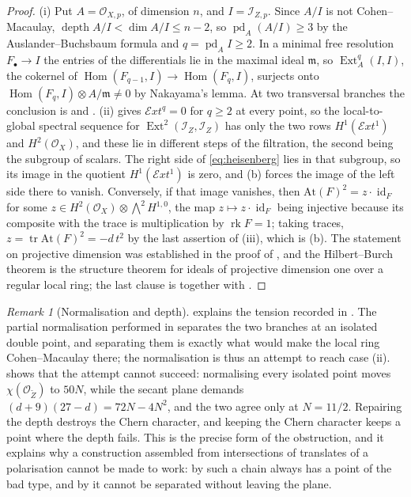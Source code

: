 \documentclass[11pt,reqno]{amsart}
\theoremstyle{plain}
\theoremstyle{definition}
\theoremstyle{remark}
\newtheorem{remark}[theorem]{Remark}
\newcommand{\cE}{\mathcal{E}}
\newcommand{\cO}{\mathcal{O}}
\newcommand{\cI}{\mathcal{I}}
\DeclareMathOperator{\rk}{rk}
\DeclareMathOperator{\Hom}{Hom}
\DeclareMathOperator{\Ext}{Ext}
\DeclareMathOperator{\id}{id}
\begin{document}
\begin{proof}
(i) Put $A=\cO_{X,p}$, of dimension $n$, and $I=\cI_{Z,p}$. Since $A/I$ is not
Cohen--Macaulay, $\operatorname{depth}A/I<\dim A/I\le n-2$, so
$\operatorname{pd}_{A}(A/I)\ge3$ by the Auslander--Buchsbaum formula and
$q=\operatorname{pd}_{A}I\ge2$. In a minimal free resolution
$F_{\bullet}\to I$ the entries of the differentials lie in the maximal ideal
$\mathfrak m$, so $\Ext^{q}_{A}(I,I)$, the cokernel of
$\Hom(F_{q-1},I)\to\Hom(F_{q},I)$, surjects onto
$\Hom(F_{q},I)\otimes A/\mathfrak m\ne0$ by Nakayama's lemma. At two
transversal branches the conclusion is  and
. (ii)  gives
$\cE xt^{q}=0$ for $q\ge2$ at every point, so the local-to-global spectral
sequence for $\Ext^{2}(\cI_{Z},\cI_{Z})$ has only the two rows
$H^{1}(\cE xt^{1})$ and $H^{2}(\cO_{X})$, and these lie in different steps of
the filtration, the second being the subgroup of scalars. The right side of
\eqref{eq:heisenberg} lies in that subgroup, so its image in the quotient
$H^{1}(\cE xt^{1})$ is zero, and (b) forces the image of the left side there
to vanish. Conversely, if that image vanishes, then
$\mathrm{At}(F)^{2}=z\cdot\id_{F}$ for some
$z\in H^{2}(\cO_{X})\otimes\bigwedge^{2}H^{1,0}$, the map
$z\mapsto z\cdot\id_{F}$ being injective because its composite with the
trace is multiplication by $\rk F=1$; taking traces,
$z=\operatorname{tr}\mathrm{At}(F)^{2}=-d\,t^{2}$ by the last assertion of
(iii), which is (b). The statement on projective dimension
was established in the proof of , and the Hilbert--Burch theorem is the
structure theorem for ideals of projective dimension one over a regular local
ring; the last clause is  together with
.
\end{proof}

\begin{remark}[Normalisation and depth]%
\label{rem:normalisationcm}
 explains the tension recorded in
. The partial normalisation performed in
 separates the two branches at an isolated double point,
and separating them is exactly what would make the local ring
Cohen--Macaulay there; the normalisation is thus an attempt to reach case
(ii).  shows that the attempt cannot succeed:
normalising every isolated point moves $\chi(\cO_{\widetilde Z})$ to $50N$,
while the secant plane demands $(d+9)(27-d)=72N-4N^{2}$, and the two agree
only at $N=11/2$. Repairing the depth destroys the Chern character, and
keeping the Chern character keeps a point where the depth fails. This is the
precise form of the obstruction, and it explains why a construction
assembled from intersections of translates of a polarisation cannot be made
to work: by  such a chain always has a point of
the bad type, and by  it cannot be separated
without leaving the plane.
\end{remark}
\end{document}
